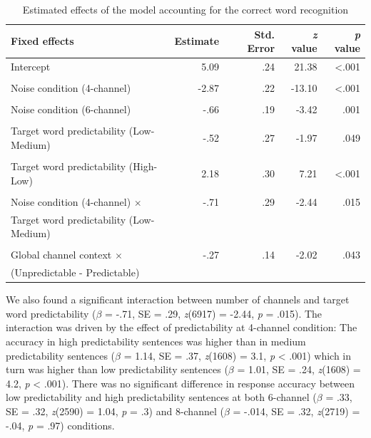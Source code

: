 \documentclass[a4paper, nobind]{templates/ociamthesis}
\begin{document}
\begin{table}[ht]
\begin{center}
\caption{Estimated effects of the model accounting for the correct word recognition}
\label{results2} 
\vskip 0.12in
\begin{tabular}[]{@{}lrrrr@{}}
\toprule
Fixed effects & Estimate & Std. Error & \emph{z} value & \emph{p}
value \\
\midrule
Intercept & 5.09 & .24 & 21.38 & \textless.001 \\
\\
Noise condition (4-channel) & -2.87 & .22 & -13.10 & \textless.001 \\
\\
Noise condition (6-channel) & -.66 & .19 & -3.42 & .001 \\
\\
Target word predictability (Low-Medium) & -.52 & .27 & -1.97 & .049 \\
\\
Target word predictability (High-Low) & 2.18 & .30 & 7.21 & \textless.001 \\
\\
Noise condition (4-channel) $\times$ & -.71 & .29 & -2.44 & .015 \\
Target word predictability (Low-Medium) \\
\\
Global channel context $\times$ & -.27 & .14 & -2.02 & .043 \\
(Unpredictable - Predictable) \\
\bottomrule
\end{tabular} 
\end{center} 
\end{table}

We also found a significant interaction between number of channels and target word predictability
(\(\beta\) = -.71, SE = .29, \emph{z}(6917) = -2.44, \emph{p} = .015).
The interaction was driven by the effect of predictability at 4-channel condition:
The accuracy in high predictability sentences was higher than in medium predictability sentences
(\(\beta\) = 1.14, SE = .37, \emph{z}(1608) = 3.1, \emph{p} \textless{} .001) which in turn was higher than low predictability sentences
(\(\beta\) = 1.01, SE = .24, \emph{z}(1608) = 4.2, \emph{p} \textless{} .001).
There was no significant difference in response accuracy between low predictability and high predictability sentences
at both 6-channel (\(\beta\) = .33, SE = .32, \emph{z}(2590) = 1.04, \emph{p} = .3)
and 8-channel (\(\beta\) = -.014, SE = .32, \emph{z}(2719) = -.04, \emph{p} = .97) conditions.
\end{document}
